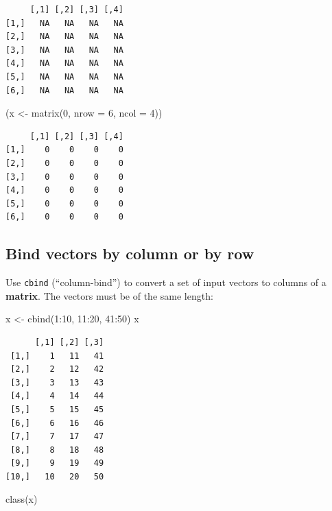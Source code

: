 \documentclass[
]{book}
\newenvironment{Shaded}{\begin{snugshade}}{\end{snugshade}}
\newcommand{\AttributeTok}[1]{\textcolor[rgb]{0.77,0.63,0.00}{#1}}
\newcommand{\DecValTok}[1]{\textcolor[rgb]{0.00,0.00,0.81}{#1}}
\newcommand{\FunctionTok}[1]{\textcolor[rgb]{0.00,0.00,0.00}{#1}}
\newcommand{\NormalTok}[1]{#1}
\newcommand{\OtherTok}[1]{\textcolor[rgb]{0.56,0.35,0.01}{#1}}
\newcommand{\SpecialCharTok}[1]{\textcolor[rgb]{0.00,0.00,0.00}{#1}}
\begin{document}
\begin{verbatim}
     [,1] [,2] [,3] [,4]
[1,]   NA   NA   NA   NA
[2,]   NA   NA   NA   NA
[3,]   NA   NA   NA   NA
[4,]   NA   NA   NA   NA
[5,]   NA   NA   NA   NA
[6,]   NA   NA   NA   NA
\end{verbatim}

\begin{Shaded}
\begin{Highlighting}[]
\NormalTok{(x }\OtherTok{\textless{}{-}} \FunctionTok{matrix}\NormalTok{(}\DecValTok{0}\NormalTok{, }\AttributeTok{nrow =} \DecValTok{6}\NormalTok{, }\AttributeTok{ncol =} \DecValTok{4}\NormalTok{))}
\end{Highlighting}
\end{Shaded}

\begin{verbatim}
     [,1] [,2] [,3] [,4]
[1,]    0    0    0    0
[2,]    0    0    0    0
[3,]    0    0    0    0
[4,]    0    0    0    0
[5,]    0    0    0    0
[6,]    0    0    0    0
\end{verbatim}

\hypertarget{bind-vectors-by-column-or-by-row}{%
\subsection{Bind vectors by column or by row}\label{bind-vectors-by-column-or-by-row}}

Use \texttt{cbind} (``column-bind'') to convert a set of input vectors to columns of a \textbf{matrix}. The vectors must be of the same length:

\begin{Shaded}
\begin{Highlighting}[]
\NormalTok{x }\OtherTok{\textless{}{-}} \FunctionTok{cbind}\NormalTok{(}\DecValTok{1}\SpecialCharTok{:}\DecValTok{10}\NormalTok{, }\DecValTok{11}\SpecialCharTok{:}\DecValTok{20}\NormalTok{, }\DecValTok{41}\SpecialCharTok{:}\DecValTok{50}\NormalTok{)}
\NormalTok{x}
\end{Highlighting}
\end{Shaded}

\begin{verbatim}
      [,1] [,2] [,3]
 [1,]    1   11   41
 [2,]    2   12   42
 [3,]    3   13   43
 [4,]    4   14   44
 [5,]    5   15   45
 [6,]    6   16   46
 [7,]    7   17   47
 [8,]    8   18   48
 [9,]    9   19   49
[10,]   10   20   50
\end{verbatim}

\begin{Shaded}
\begin{Highlighting}[]
\FunctionTok{class}\NormalTok{(x)}
\end{Highlighting}
\end{Shaded}
\end{document}
